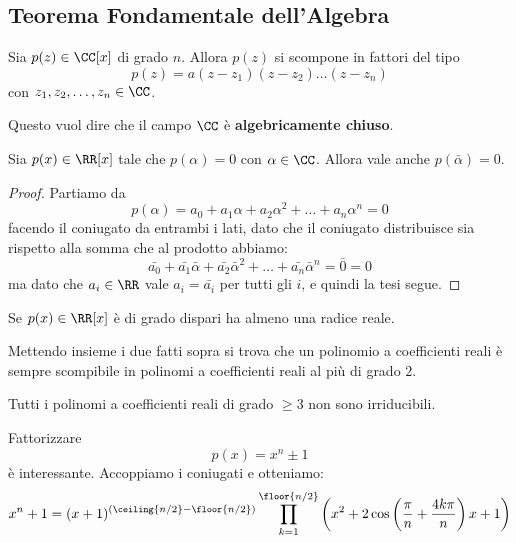 \documentclass[11pt]{scrartcl}
\begin{document}
	\subsection{Teorema Fondamentale dell'Algebra}
	\begin{theorem}
		Sia $p(z)\in\CC[x]$ di grado $n$. Allora $p(z)$ si scompone in fattori del tipo
		$$p(z)=a(z-z_1)(z-z_2)\dots(z-z_n)$$
		con $z_1,z_2,\dots,z_n\in\CC$.
	\end{theorem}
	Questo vuol dire che il campo $\CC$ è \textbf{algebricamente chiuso}.
	\begin{theorem}
		Sia $p(x)\in\RR[x]$ tale che $p(\alpha)=0$ con $\alpha\in\CC$. Allora vale anche $p(\bar{\alpha})=0$.
	\end{theorem}
	\begin{proof}
		Partiamo da
		$$p(\alpha)=a_0+a_1\alpha+a_2\alpha^2+\dots+a_n\alpha^n=0$$
		facendo il coniugato da entrambi i lati, dato che il coniugato distribuisce sia rispetto alla somma che al prodotto abbiamo:
		$$\bar{a_0}+\bar{a_1}\bar{\alpha}+\bar{a_2}\bar{\alpha}^2+\dots+\bar{a_n}\bar{\alpha}^n=\bar{0}=0$$
		ma dato che $a_i\in\RR$ vale $a_i=\bar{a_i}$ per tutti gli $i$, e quindi la tesi segue.
	\end{proof}
	\begin{corollary}
		Se $p(x)\in\RR[x]$ è di grado dispari ha almeno una radice reale.
	\end{corollary}
	Mettendo insieme i due fatti sopra si trova che un polinomio a coefficienti reali è sempre scompibile in polinomi a coefficienti reali al più di grado $2$. 
	\begin{corollary}
		Tutti i polinomi a coefficienti reali di grado $\ge 3$ non sono irriducibili.
	\end{corollary} 
	Fattorizzare $$p(x)=x^n\pm 1$$ è interessante. Accoppiamo i coniugati e otteniamo:
	$$x^n+1=(x+1)^{\left(\ceiling{n/2}-\floor{n/2}\right)}\prod_{k=1}^{\floor{n/2}}\left(x^2+2\cos\left(\frac{\pi}{n}+\frac{4k\pi}{n}\right)x+1\right)$$
	
\end{document}
